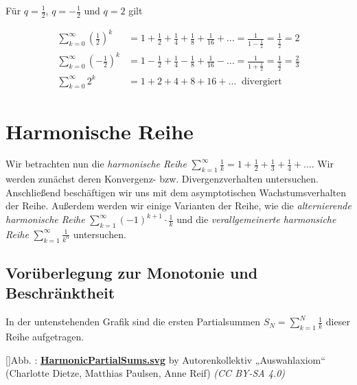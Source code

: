\documentclass[fontsize=9pt,
               parskip=half-,
               DIV=14,
               listof=chapterentry,
               tocflat]{scrbook}
\newcounter{imagelabel}
\begin{document}
\begin{example*}
Für $q={\tfrac {1}{2}}$, $q=-{\tfrac {1}{2}}$ und $q=2$ gilt

\begin{align*}
\sum _{k=0}^{\infty }\left({\frac {1}{2}}\right)^{k}&=1+{\frac {1}{2}}+{\frac {1}{4}}+{\frac {1}{8}}+{\frac {1}{16}}+\ldots ={\frac {1}{1-{\frac {1}{2}}}}={\frac {1}{\frac {1}{2}}}=2\\[1em]\sum _{k=0}^{\infty }\left(-{\frac {1}{2}}\right)^{k}&=1-{\frac {1}{2}}+{\frac {1}{4}}-{\frac {1}{8}}+{\frac {1}{16}}-\ldots ={\frac {1}{1+{\frac {1}{2}}}}={\frac {1}{\frac {3}{2}}}={\frac {2}{3}}\\[1em]\sum _{k=0}^{\infty }2^{k}&=1+2+4+8+16+\ldots \ {\text{ divergiert}}
\end{align*}

\end{example*}

\chapter{Harmonische Reihe}

Wir betrachten nun die \emph{harmonische Reihe} $\sum _{k=1}^{\infty }{\frac {1}{k}}=1+{\frac {1}{2}}+{\frac {1}{3}}+{\frac {1}{4}}+\ldots $. Wir werden zunächst deren Konvergenz- bzw. Divergenzverhalten untersuchen. Anschließend beschäftigen wir uns mit dem asymptotischen Wachstumsverhalten der Reihe. Außerdem werden wir einige Varianten der Reihe, wie die \emph{alternierende harmonische Reihe} $\sum _{k=1}^{\infty }(-1)^{k+1}\cdot {\frac {1}{k}}$ und die \emph{verallgemeinerte harmonsiche Reihe} $\sum _{k=1}^{\infty }{\frac {1}{k^{\alpha }}}$ untersuchen.

\section{Vorüberlegung zur Monotonie und Beschränktheit}

In der untenstehenden Grafik sind die ersten Partialsummen $S_{N}=\sum _{k=1}^{N}{\frac {1}{k}}$ dieser Reihe aufgetragen.

[]{Abb. : \protect\href{https://commons.wikimedia.org/wiki/File:HarmonicPartialSums.svg}{\textbf{HarmonicPartialSums.svg}} by Autorenkollektiv „Auswahlaxiom“ (Charlotte Dietze, Matthias Paulsen, Anne Reif) \textit{(CC BY-SA 4.0)}}\begin{center}
\end{center}
\end{document}
